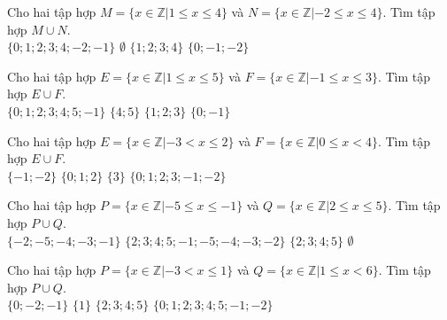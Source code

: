 \begin{ex}
 Cho hai tập hợp $M=\{x\in \mathbb{Z}|1 \le x \le 4\}$ và $N=\{x\in \mathbb{Z}|-2 \le x \le 4\}$. Tìm tập hợp $M \cup N$.\\ 
\choice
{ \True $\{{0; 1; 2; 3; 4; -2; -1}\}$ }
   { $\emptyset$ }
     { $\{{1; 2; 3; 4}\}$ }
    { $\{{0; -1; -2}\}$ }
\end{ex}

\begin{ex}
 Cho hai tập hợp $E=\{x\in \mathbb{Z}|1 \le x \le 5\}$ và $F=\{x\in \mathbb{Z}|-1 \le x \le 3\}$. Tìm tập hợp $E \cup F$.\\ 
\choice
{ \True $\{{0; 1; 2; 3; 4; 5; -1}\}$ }
   { $\{{4; 5}\}$ }
     { $\{{1; 2; 3}\}$ }
    { $\{{0; -1}\}$ }
\end{ex}

\begin{ex}
 Cho hai tập hợp $E=\{x\in \mathbb{Z}|-3 < x \le 2\}$ và $F=\{x\in \mathbb{Z}|0 \le x < 4\}$. Tìm tập hợp $E \cup F$.\\ 
\choice
{ $\{{-1; -2}\}$ }
   { $\{{0; 1; 2}\}$ }
     { $\{{3}\}$ }
    { \True $\{{0; 1; 2; 3; -1; -2}\}$ }
\end{ex}

\begin{ex}
 Cho hai tập hợp $P=\{x\in \mathbb{Z}|-5 \le x \le -1\}$ và $Q=\{x\in \mathbb{Z}|2 \le x \le 5\}$. Tìm tập hợp $P \cup Q$.\\ 
\choice
{ $\{{-2; -5; -4; -3; -1}\}$ }
   { \True $\{{2; 3; 4; 5; -1; -5; -4; -3; -2}\}$ }
     { $\{{2; 3; 4; 5}\}$ }
    { $\emptyset$ }
\end{ex}

\begin{ex}
 Cho hai tập hợp $P=\{x\in \mathbb{Z}|-3 < x \le 1\}$ và $Q=\{x\in \mathbb{Z}|1 \le x < 6\}$. Tìm tập hợp $P \cup Q$.\\ 
\choice
{ $\{{0; -2; -1}\}$ }
   { $\{{1}\}$ }
     { $\{{2; 3; 4; 5}\}$ }
    { \True $\{{0; 1; 2; 3; 4; 5; -1; -2}\}$ }
\end{ex}

